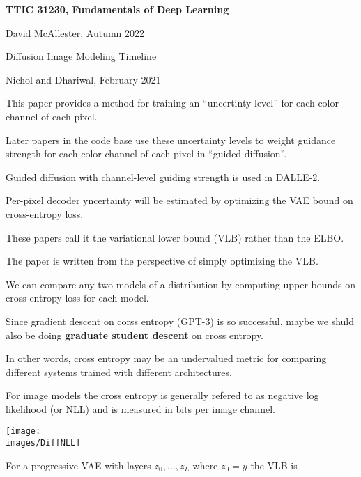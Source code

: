 





{\Huge

  \centerline{\bf TTIC 31230, Fundamentals of Deep Learning}
  \bigskip
  \centerline{David McAllester, Autumn 2022}
  \vfill
  \vfil
  \centerline{Diffusion Image Modeling Timeline}
  \vfill
  \vfill

{Nichol and Dhariwal, February 2021}

\vfill
This paper provides a method for training an ``uncertinty level'' for each color channel of each pixel.

\vfill
Later papers in the code base use these uncertainty levels to weight guidance strength for each color channel of each pixel in ``guided diffusion''.

\vfill
Guided diffusion with channel-level guiding strength is used in DALLE-2.


Per-pixel decoder yncertainty will be estimated by optimizing the VAE bound on cross-entropy loss.

\vfill
These papers call it the variational lower bound (VLB) rather than the ELBO.

\vfill
The paper is written from the perspective of simply optimizing the VLB.


We can compare any two models of a distribution by computing upper bounds on cross-entropy loss for each model.

\vfill
Since gradient descent on corss entropy (GPT-3) is so successful, maybe we shuld also be doing {\bf graduate student descent} on cross entropy.

\vfill
In other words, cross entropy may be an undervalued metric for comparing different systems trained with different architectures.



For image models the cross entropy is generally refered to as negative log likelihood (or NLL) and is measured in bits per image channel.

\centerline{\texttt{[image: \\images/DiffNLL]}}


For a progressive VAE with layers $z_0,\ldots,z_L$ where $z_0 = y$ the VLB is

}
